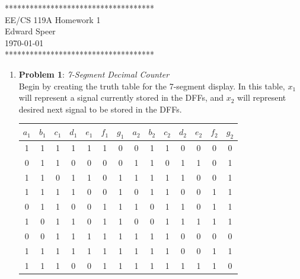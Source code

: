 \documentclass{article}
\newcommand{\HWNUM}{1}
\begin{document}

    \begin{center}
        ************************************ \\
        EE/CS 119A Homework \HWNUM \\
        Edward Speer \\
        \today \\
        ************************************
    \end{center}

    \begin{enumerate}
    
        \item \textbf{Problem 1}: \emph{7-Segment Decimal Counter} \\
            
            Begin by creating the truth table for the 7-segment display. In this
            table, $x_1$ will represent a signal currently stored in the DFFs,
            and $x_2$ will represent desired next signal to be stored in the
            DFFs.

            \begin{center}
                \begin{tabular}{|c c c c c c c|c c c c c c c|}
                \hline
                $a_1$&$b_1$&$c_1$&$d_1$&$e_1$&$f_1$&$g_1$&
                $a_2$&$b_2$&$c_2$&$d_2$&$e_2$&$f_2$&$g_2$\\
                \hline
                1&1&1&1&1&1&0& 0&1&1&0&0&0&0\\
                0&1&1&0&0&0&0& 1&1&0&1&1&0&1\\
                1&1&0&1&1&0&1& 1&1&1&1&0&0&1\\
                1&1&1&1&0&0&1& 0&1&1&0&0&1&1\\
                0&1&1&0&0&1&1& 1&0&1&1&0&1&1\\
                1&0&1&1&0&1&1& 0&0&1&1&1&1&1\\
                0&0&1&1&1&1&1& 1&1&1&0&0&0&0\\
                1&1&1&1&1&1&1& 1&1&1&0&0&1&1\\
                1&1&1&0&0&1&1& 1&1&1&1&1&1&0\\
                \hline
                \end{tabular}
            \end{center}


\end{enumerate}
\end{document}
